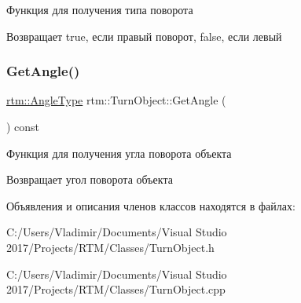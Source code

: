 Функция для получения типа поворота 

\begin{DoxyReturn}{Возвращает}
true, если правый поворот, false, если левый 
\end{DoxyReturn}
\mbox{\label{classrtm_1_1_turn_object_ae3fbfdd8e940bbb61d3a68db236d60b5}} 
\subsubsection{\texorpdfstring{Get\+Angle()}{GetAngle()}}
{\footnotesize\ttfamily \hyperlink{namespacertm_a69dc82b16a0148c10962caa83d930f89}{rtm\+::\+Angle\+Type} rtm\+::\+Turn\+Object\+::\+Get\+Angle (\begin{DoxyParamCaption}{ }\end{DoxyParamCaption}) const}



Функция для получения угла поворота объекта 

\begin{DoxyReturn}{Возвращает}
угол поворота объекта 
\end{DoxyReturn}


Объявления и описания членов классов находятся в файлах\+:\begin{DoxyCompactItemize}
\item 
C\+:/\+Users/\+Vladimir/\+Documents/\+Visual Studio 2017/\+Projects/\+R\+T\+M/\+Classes/Turn\+Object.\+h\item 
C\+:/\+Users/\+Vladimir/\+Documents/\+Visual Studio 2017/\+Projects/\+R\+T\+M/\+Classes/Turn\+Object.\+cpp\end{DoxyCompactItemize}
